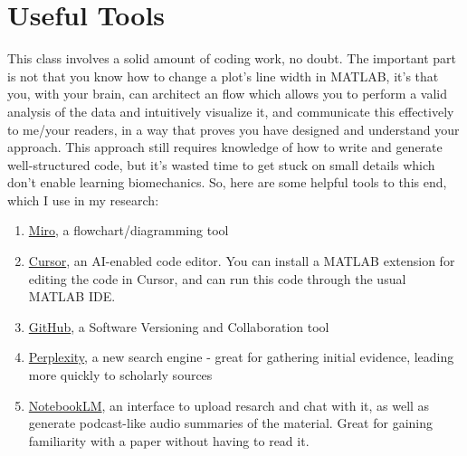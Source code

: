 \documentclass{article}
\begin{document}
\section {Useful Tools}
This class involves a solid amount of coding work, no doubt. The important part is not that you know how to change a plot's line width in MATLAB, it's that you, with your brain, can architect an flow which allows you to perform a valid analysis of the data and intuitively visualize it, and communicate this effectively to me/your readers, in a way that proves you have designed and understand your approach. This approach still requires knowledge of how to write and generate well-structured code, but it's wasted time to get stuck on small details which don't enable learning biomechanics. So, here are some helpful tools to this end, which I use in my research:

\begin{enumerate}
\item \href{https://miro.com/}{Miro}, a flowchart/diagramming tool
\item \href{https://www.cursor.com/}{Cursor}, an AI-enabled code editor. You can install a MATLAB extension for editing the code in Cursor, and can run this code through the usual MATLAB IDE.
\item \href{https://www.github.com}{GitHub}, a Software Versioning and Collaboration tool
\item \href{https://www.perplexity.ai/}{Perplexity}, a new search engine - great for gathering initial evidence, leading more quickly to scholarly sources
\item \href{https://notebooklm.google.com/}{NotebookLM}, an interface to upload resarch and chat with it, as well as generate podcast-like audio summaries of the material. Great for gaining familiarity with a paper without having to read it.
\end{enumerate}
\end{document}
